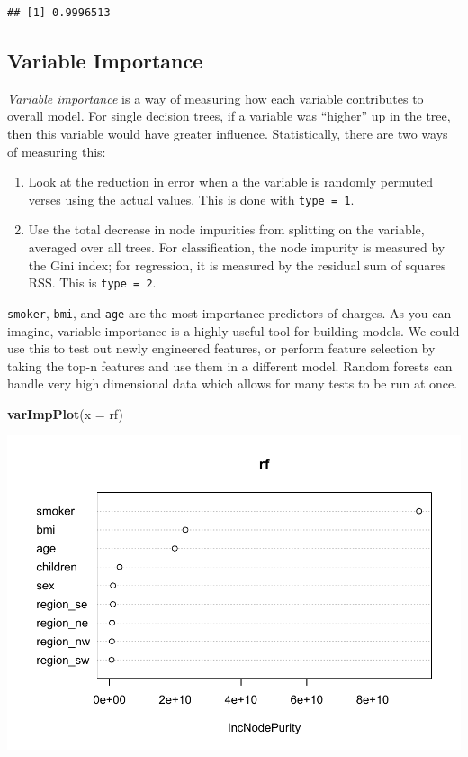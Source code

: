 \documentclass[openany]{book}
\newenvironment{Shaded}{\begin{snugshade}}{\end{snugshade}}
\newcommand{\DataTypeTok}[1]{\textcolor[rgb]{0.13,0.29,0.53}{#1}}
\newcommand{\KeywordTok}[1]{\textcolor[rgb]{0.13,0.29,0.53}{\textbf{#1}}}
\newcommand{\NormalTok}[1]{#1}
\begin{document}
\begin{verbatim}
## [1] 0.9996513
\end{verbatim}

\hypertarget{variable-importance}{%
\subsection{Variable Importance}\label{variable-importance}}

\emph{Variable importance} is a way of measuring how each variable contributes to overall model. For single decision trees, if a variable was ``higher'' up in the tree, then this variable would have greater influence. Statistically, there are two ways of measuring this:

\begin{enumerate}
\def\labelenumi{\arabic{enumi})}
\item
  Look at the reduction in error when a the variable is randomly permuted verses using the actual values. This is done with \texttt{type\ =\ 1}.
\item
  Use the total decrease in node impurities from splitting on the variable, averaged over all trees. For classification, the node impurity is measured by the Gini index; for regression, it is measured by the residual sum of squares \(\text{RSS}\). This is \texttt{type\ =\ 2}.
\end{enumerate}

\texttt{smoker}, \texttt{bmi}, and \texttt{age} are the most importance predictors of charges. As you can imagine, variable importance is a highly useful tool for building models. We could use this to test out newly engineered features, or perform feature selection by taking the top-n features and use them in a different model. Random forests can handle very high dimensional data which allows for many tests to be run at once.

\begin{Shaded}
\begin{Highlighting}[]
\KeywordTok{varImpPlot}\NormalTok{(}\DataTypeTok{x =}\NormalTok{ rf)}
\end{Highlighting}
\end{Shaded}

\includegraphics{06-tree-based-models_files/figure-latex/unnamed-chunk-16-1.pdf}
\end{document}
